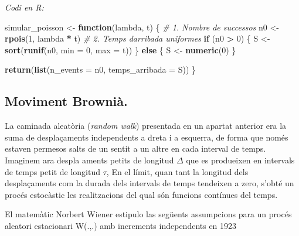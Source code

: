 \documentclass[
  catalan,
]{article}
\newenvironment{Shaded}{\begin{snugshade}}{\end{snugshade}}
\newcommand{\AttributeTok}[1]{\textcolor[rgb]{0.13,0.29,0.53}{#1}}
\newcommand{\CommentTok}[1]{\textcolor[rgb]{0.56,0.35,0.01}{\textit{#1}}}
\newcommand{\ControlFlowTok}[1]{\textcolor[rgb]{0.13,0.29,0.53}{\textbf{#1}}}
\newcommand{\DecValTok}[1]{\textcolor[rgb]{0.00,0.00,0.81}{#1}}
\newcommand{\FunctionTok}[1]{\textcolor[rgb]{0.13,0.29,0.53}{\textbf{#1}}}
\newcommand{\NormalTok}[1]{#1}
\newcommand{\OtherTok}[1]{\textcolor[rgb]{0.56,0.35,0.01}{#1}}
\newcommand{\SpecialCharTok}[1]{\textcolor[rgb]{0.81,0.36,0.00}{\textbf{#1}}}
\theoremstyle{definition}
\theoremstyle{definition}
\theoremstyle{definition}
\theoremstyle{definition}
\theoremstyle{remark}
\begin{document}
\emph{Codi en R:}

\begin{Shaded}
\begin{Highlighting}[]
\NormalTok{simular\_poisson }\OtherTok{\textless{}{-}} \ControlFlowTok{function}\NormalTok{(lambda, t) \{}
  \CommentTok{\# 1. Nombre de successos}
\NormalTok{  n0 }\OtherTok{\textless{}{-}} \FunctionTok{rpois}\NormalTok{(}\DecValTok{1}\NormalTok{, lambda }\SpecialCharTok{*}\NormalTok{ t)}
  \CommentTok{\# 2. Temps d\textquotesingle{}arribada uniformes}
  \ControlFlowTok{if}\NormalTok{ (n0 }\SpecialCharTok{\textgreater{}} \DecValTok{0}\NormalTok{) \{}
\NormalTok{    S }\OtherTok{\textless{}{-}} \FunctionTok{sort}\NormalTok{(}\FunctionTok{runif}\NormalTok{(n0, }\AttributeTok{min =} \DecValTok{0}\NormalTok{, }\AttributeTok{max =}\NormalTok{ t))}
\NormalTok{  \} }\ControlFlowTok{else}\NormalTok{ \{}
\NormalTok{    S }\OtherTok{\textless{}{-}} \FunctionTok{numeric}\NormalTok{(}\DecValTok{0}\NormalTok{)}
\NormalTok{  \}}
  
  \FunctionTok{return}\NormalTok{(}\FunctionTok{list}\NormalTok{(}\AttributeTok{n\_events =}\NormalTok{ n0, }\AttributeTok{temps\_arribada =}\NormalTok{ S))}
\NormalTok{\}}
\end{Highlighting}
\end{Shaded}

\subsection{Moviment Brownià.}\label{moviment-browniuxe0.}

La caminada aleatòria (\emph{random walk}) presentada en un apartat anterior era la suma de desplaçaments independents a dreta i a esquerra, de forma que només estaven permesos salts de un sentit a un altre en cada interval de temps. Imaginem ara despla
aments petits de longitud \(\Delta\) que es produeixen en intervals de temps petit de longitud \(\tau\), En el límit, quan tant la longitud dels desplaçaments com la durada dels intervals de temps tendeixen a zero, s'obté un procés estocàstic les realitzacions del qual són funcions contínues del temps.

El matemàtic Norbert Wiener estipulo las següents assumpcions para un procés aleatori estacionari W(.,.) amb increments independents en 1923
\end{document}
